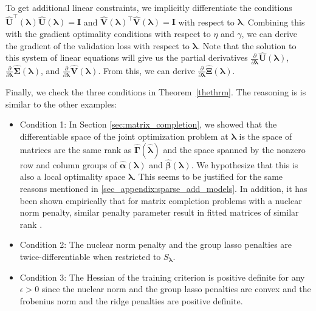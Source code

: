 \documentclass[12pt,letterpaper]{article}
\begin{document}
To get additional linear constraints, we implicitly differentiate the conditions $\boldsymbol{\hat U}^\top(\boldsymbol{\lambda}) \boldsymbol{\hat{U}}(\boldsymbol{\lambda}) = \boldsymbol{I}$ and $\boldsymbol{\hat{V}}(\boldsymbol{\lambda})^\top \boldsymbol{\hat{V}}(\boldsymbol{\lambda}) = \boldsymbol{I}$ with respect to $\boldsymbol{\lambda}$. Combining this with the gradient optimality conditions with respect to $\eta$ and $\gamma$, we can derive the gradient of the validation loss with respect to $\boldsymbol{\lambda}$. Note that the solution to this system of linear equations will give us the partial derivatives $\frac{\partial}{\partial \boldsymbol{\lambda}}\hat{\boldsymbol{U}}(\boldsymbol{\lambda})$, $\frac{\partial}{\partial \boldsymbol{\lambda}}\hat{\boldsymbol{\Sigma}}(\boldsymbol{\lambda})$, and $\frac{\partial}{\partial \boldsymbol{\lambda}}\hat{\boldsymbol{V}}(\boldsymbol{\lambda})$. From this, we can derive $\frac{\partial}{\partial \boldsymbol{\lambda}}\hat{\boldsymbol{\Xi}}(\boldsymbol{\lambda})$.

Finally, we check the three conditions in Theorem~\ref{thethrm}. The reasoning is is similar to the other examples:
\begin{itemize}
	\item[] Condition 1: In Section \ref{sec:matrix_completion}, we showed that the differentiable space of the joint optimization problem at $\boldsymbol{\lambda}$ is the space of matrices are the same rank as $\hat{\boldsymbol{\Gamma}}(\hat{\boldsymbol{\lambda}})$ and the space spanned by the nonzero row and column groups of $\hat{\boldsymbol{\alpha}}(\boldsymbol{\lambda})$ and $\hat{\boldsymbol{\beta}}(\boldsymbol{\lambda})$. We hypothesize that this is also a local optimality space $\boldsymbol{\lambda}$. This seems to be justified for the same reasons mentioned in \ref{sec_appendix:sparse_add_models}. In addition, it has been shown empirically that for matrix completion problems with a nuclear norm penalty, similar penalty parameter result in fitted matrices of similar rank \citep{mazumder2010spectral}.
	\item[] Condition 2: The nuclear norm penalty and the group lasso penalties are twice-differentiable when restricted to $S_{\boldsymbol{\lambda}}$.\hfill {}
	\item[] Condition 3: The Hessian of the training criterion is positive definite for any $\epsilon > 0$ since the nuclear norm and the group lasso penalties are convex and the frobenius norm and the ridge penalties are positive definite. \hfill {}
\end{itemize}
\end{document}
